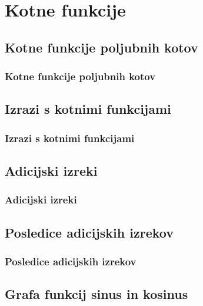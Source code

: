 \section{Kotne funkcije}

\begin{frame}
    \sectionpage
\end{frame}

\begin{frame}
\end{frame}

    \subsection{Kotne funkcije poljubnih kotov}

        \begin{frame}
            \frametitle{Kotne funkcije poljubnih kotov}
        \end{frame}

    \subsection{Izrazi s kotnimi funkcijami}

        \begin{frame}
            \frametitle{Izrazi s kotnimi funkcijami}
        \end{frame}

    \subsection{Adicijski izreki}

        \begin{frame}
            \frametitle{Adicijski izreki}
        \end{frame}

    \subsection{Posledice adicijskih izrekov}

        \begin{frame}
            \frametitle{Posledice adicijskih izrekov}
        \end{frame}

    \subsection{Grafa funkcij sinus in kosinus}

